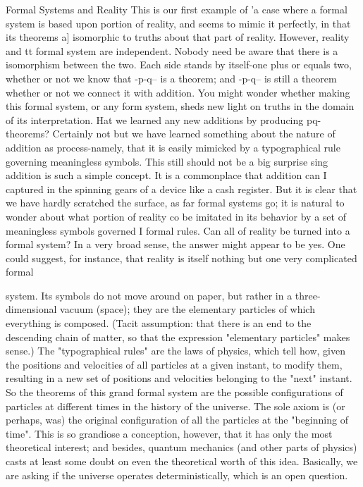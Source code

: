 Formal Systems and Reality This is our first example of 'a case where a formal system is based upon portion of reality, and seems to mimic it perfectly, in that its theorems a] isomorphic to truths about that part of reality. However, reality and tt formal system are independent. Nobody need be aware that there is a isomorphism between the two. Each side stands by itself-one plus or equals two, whether or not we know that -p-q-- is a theorem; and -p-q-- is still a theorem whether or not we connect it with addition. You might wonder whether making this formal system, or any form system, sheds new light on truths in the domain of its interpretation. Hat we learned any new additions by producing pq-theorems? Certainly not but we have learned something about the nature of addition as process-namely, that it is easily mimicked by a typographical rule governing meaningless symbols. This still should not be a big surprise sing addition is such a simple concept. It is a commonplace that addition can I captured in the spinning gears of a device like a cash register. But it is clear that we have hardly scratched the surface, as far formal systems go; it is natural to wonder about what portion of reality co be imitated in its behavior by a set of meaningless symbols governed I formal rules. Can all of reality be turned into a formal system? In a very broad sense, the answer might appear to be yes. One could suggest, for instance, that reality is itself nothing but one very complicated formal 







system. Its symbols do not move around on paper, but rather in a three-dimensional vacuum (space); they are the elementary particles of which everything is composed. (Tacit assumption: that there is an end to the descending chain of matter, so that the expression "elementary particles" makes sense.) The "typographical rules" are the laws of physics, which tell how, given the positions and velocities of all particles at a given instant, to modify them, resulting in a new set of positions and velocities belonging to the "next" instant. So the theorems of this grand formal system are the possible configurations of particles at different times in the history of the universe. The sole axiom is (or perhaps, was) the original configuration of all the particles at the "beginning of time". This is so grandiose a conception, however, that it has only the most theoretical interest; and besides, quantum mechanics (and other parts of physics) casts at least some doubt on even the theoretical worth of this idea. Basically, we are asking if the universe operates deterministically, which is an open question. 

